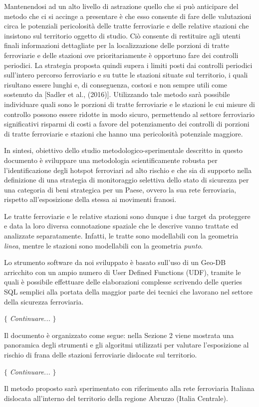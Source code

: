 Mantenendosi ad un alto livello di astrazione quello che si può anticipare del metodo che ci si accinge a presentare è che esso consente di fare delle valutazioni circa le potenziali pericolosità delle tratte ferroviarie e delle relative stazioni che insistono sul territorio oggetto di studio. Ciò consente di restituire agli utenti finali informazioni dettagliate per la localizzazione delle porzioni di tratte ferroviarie e delle stazioni ove prioritariamente è opportuno fare dei controlli periodici.
La strategia proposta quindi supera i limiti posti dai controlli periodici sull'intero percorso ferroviario e su tutte le stazioni situate sul territorio, i quali risultano essere lunghi e, di conseguenza, costosi e non sempre utili come sostenuto da [Sadler et al., (2016)]. Utilizzando tale metodo sarà possibile individuare quali sono le porzioni di tratte ferroviarie e le stazioni le cui misure di controllo possono essere ridotte in modo sicuro, permettendo al settore ferroviario significativi risparmi di costi a favore del potenziamento dei controlli di porzioni di tratte ferroviarie e stazioni che hanno una pericolosità potenziale maggiore.\newline

In sintesi, obiettivo dello studio metodologico-sperimentale descritto in questo documento è sviluppare una metodologia scientificamente robusta per l’identificazione degli hotspot ferroviari ad alto rischio e che sia di supporto nella definizione di una strategia di monitoraggio selettiva dello stato di sicurezza per una categoria di beni strategica per un Paese, ovvero la sua rete ferroviaria, rispetto all'esposizione della stessa ai movimenti franosi.\newline

Le tratte ferroviarie e le relative stazioni sono dunque i due target da proteggere e data la loro diversa connotazione spaziale che le descrive vanno trattate ed analizzate separatamente. Infatti, le tratte sono modellabili con la geometria \textit{linea}, mentre le stazioni sono modellabili con la geometria \textit{punto}.\newline

Lo strumento software da noi sviluppato è basato sull'uso di un Geo-DB arricchito con un ampio numero di User Defined Functions (UDF), tramite le quali è possibile effettuare delle elaborazioni complesse scrivendo delle queries SQL semplici alla portata della maggior parte dei tecnici che lavorano nel settore della sicurezza ferroviaria.

$\{$ \textit{Continuare...} $\}$

Il documento è organizzato come segue: nella Sezione 2 viene mostrata una panoramica degli strumenti e gli algoritmi utilizzati per valutare l’esposizione al rischio di frana delle stazioni ferroviarie dislocate sul territorio.

$\{$ \textit{Continuare...} $\}$

Il metodo proposto sarà sperimentato con riferimento alla rete ferroviaria Italiana dislocata all'interno del territorio della regione Abruzzo (Italia Centrale).